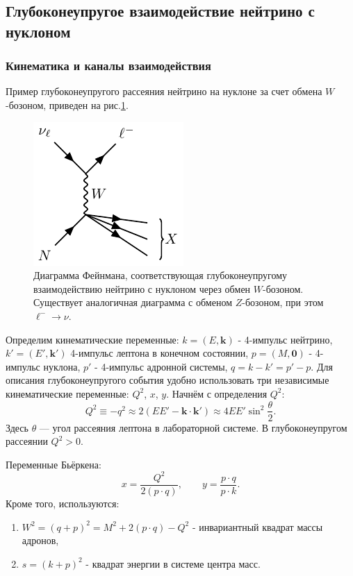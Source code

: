 \subsection{Глубоконеупругое взаимодействие нейтрино с нуклоном}
\subsubsection{Кинематика и каналы взаимодействия}
Пример глубоконеупругого рассеяния нейтрино  на нуклоне за счет обмена $W$-бозоном, приведен на рис.\ref{fig:DIS}.
\begin{figure}[!h]
\centering
\includegraphics[width=0.4\linewidth]{images/neutrino-nucleon-dis.pdf}
\caption{Диаграмма Фейнмана, соответствующая глубоконеупругому взаимодействию нейтрино с нуклоном через обмен $W$-бозоном.  Существует аналогичная диаграмма с обменом  $Z$-бозоном, при этом $\ell^-\to \nu$.}
\label{fig:DIS}
\end{figure}
Определим кинематические переменные: $k = (E, \bm{k})$ - 4-импульс нейтрино, $k' = (E', \bm{k}')$ 4-импульс  лептона в  конечном состоянии, $p=(M,\bm{0})$ - 4-импульс нуклона, $p'$ - 4-импульс  адронной системы, $q = k-k' = p'-p$. 
Для описания глубоконеупругого события удобно использовать три независимые кинематические переменные: \( Q^2 \), \( x \), \( y \).
Начнём с определения $Q^2$:
\begin{equation}
  Q^2 \equiv -q^2 \approx 2 (EE' - \bm{k} \cdot \bm{k}') \approx 4EE' \sin^2\frac{\theta}{2}.
\end{equation}
Здесь \( \theta \) — угол рассеяния лептона в лабораторной системе. В глубоконеупругом рассеянии \( Q^2 > 0 \).

Переменные Бьёркена:
\begin{equation}
  x = \frac{Q^2}{2(p \cdot q)}, \qquad y = \frac{p \cdot q}{p \cdot k}.
\end{equation}
Кроме того, используются: 
\begin{enumerate}
\item $W^2 = (q+p)^2 = M^2+2 (p\cdot q) -Q^2$ - инвариантный квадрат массы адронов,
\item $s = (k+p)^2$ - квадрат энергии в системе центра масс.
\end{enumerate}


